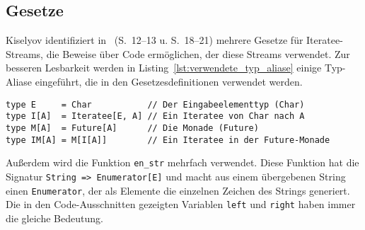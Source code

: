 


\subsection{Gesetze} %
\label{sub:iteratee_gesetze}

Kiselyov identifiziert in \citealt{kiselyov2012}~(S.~12--13 u. S.~18--21) mehrere Gesetze für Iteratee-Streams, die Beweise über Code ermöglichen, der diese Streams verwendet.
Zur besseren Lesbarkeit werden in Listing~\ref{lst:verwendete_typ_aliase} einige Typ-Aliase eingeführt, die in den Gesetzesdefinitionen verwendet werden.

\begin{lstlisting}[caption=Typ-Aliase der Gesetze, label=lst:verwendete_typ_aliase]
type E     = Char           // Der Eingabeelementtyp (Char)
type I[A]  = Iteratee[E, A] // Ein Iteratee von Char nach A
type M[A]  = Future[A]      // Die Monade (Future)
type IM[A] = M[I[A]]        // Ein Iteratee in der Future-Monade
\end{lstlisting}

Außerdem wird die Funktion \lstinline|en_str| mehrfach verwendet.
Diese Funktion hat die Signatur \lstinline|String => Enumerator[E]| und macht aus einem übergebenen String einen \lstinline|Enumerator|, der als Elemente die einzelnen Zeichen des Strings generiert.
Die in den Code-Ausschnitten gezeigten Variablen \lstinline|left| und \lstinline|right| haben immer die gleiche Bedeutung.

